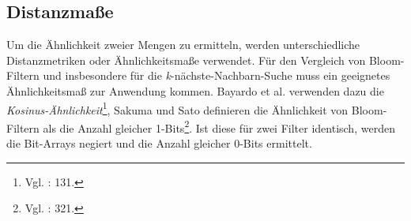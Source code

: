 \subsection{Distanzmaße}\label{sec:distanzmasse}
Um die Ähnlichkeit zweier Mengen zu ermitteln, werden unterschiedliche Distanzmetriken oder Ähnlichkeitsmaße verwendet. Für den Vergleich von Bloom-Filtern und insbesondere für die \textit{k}-nächste-Nachbarn-Suche muss ein geeignetes Ähnlichkeitsmaß zur Anwendung kommen. Bayardo et al. verwenden dazu die \textit{Kosinus-Ähnlichkeit}\footnote{Vgl. \cite{Bayardo2007}: 131.}, Sakuma und Sato definieren die Ähnlichkeit von Bloom-Filtern als die Anzahl gleicher 1-Bits\footnote{Vgl. \cite{Sakuma2011}: 321.}. Ist diese für zwei Filter identisch, werden die Bit-Arrays negiert und die Anzahl gleicher 0-Bits ermittelt. 

